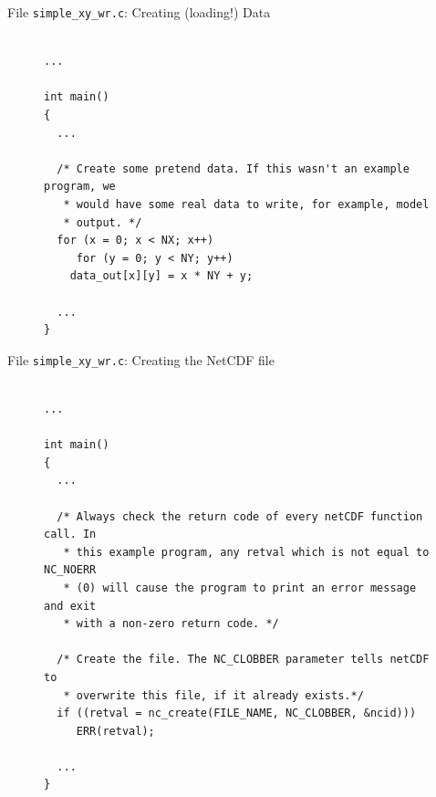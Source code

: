 \documentclass[compress,11pt,xcolor=svgnames,aspectratio=169]{beamer}
\begin{document}
\begin{frame}[fragile]{File \texttt{simple\_xy\_wr.c}: Creating (loading!) Data}

\begin{figure}
\centering
\begin{varwidth}{\linewidth}
{\tiny

\begin{verbatim}

...

int main()
{
  ...

  /* Create some pretend data. If this wasn't an example program, we
   * would have some real data to write, for example, model
   * output. */
  for (x = 0; x < NX; x++)
     for (y = 0; y < NY; y++)
    data_out[x][y] = x * NY + y;

  ...
}

\end{verbatim}

}
\end{varwidth}
\end{figure}

\end{frame}

\begin{frame}[fragile]{File \texttt{simple\_xy\_wr.c}: Creating the NetCDF file}

\begin{figure}
\centering
\begin{varwidth}{\linewidth}
{\tiny

\begin{verbatim}

...

int main()
{
  ...

  /* Always check the return code of every netCDF function call. In
   * this example program, any retval which is not equal to NC_NOERR
   * (0) will cause the program to print an error message and exit
   * with a non-zero return code. */

  /* Create the file. The NC_CLOBBER parameter tells netCDF to
   * overwrite this file, if it already exists.*/
  if ((retval = nc_create(FILE_NAME, NC_CLOBBER, &ncid)))
     ERR(retval);

  ...
}

\end{verbatim}

}
\end{varwidth}
\end{figure}

\end{frame}
\end{document}
